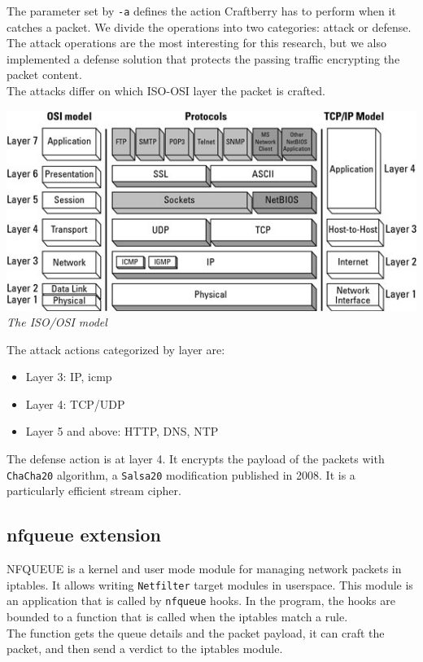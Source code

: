 \documentclass[12pt]{article}
\begin{document}
	The parameter set by \lstinline{-a} defines the action Craftberry has to perform when it catches a packet. We divide the operations into two categories: attack or defense. The attack operations are the most interesting for this research, but we also implemented a defense solution that protects the passing traffic encrypting the packet content.\\
	The attacks differ on which ISO-OSI layer the packet is crafted.\\
	
	\bigbreak

	\begin{center}
		\includegraphics[width=0.7\linewidth]{images/iso_osi_layers.jpg}\\
		\small{\textit{The ISO/OSI model}}
	\end{center}

	\bigbreak
	
	The attack actions categorized by layer are:
	\begin{itemize}
		\item Layer 3: IP, icmp
		\item Layer 4: TCP/UDP
		\item Layer 5 and above: HTTP, DNS, NTP
	\end{itemize}

	\bigbreak
	The defense action is at layer 4. It encrypts the payload of the packets with \lstinline{ChaCha20} algorithm, a \lstinline{Salsa20} modification published in 2008. It is a particularly efficient stream cipher.\\

	\subsection{nfqueue extension}
	NFQUEUE is a kernel and user mode module for managing network packets in iptables. It allows writing \lstinline{Netfilter} target modules in userspace. This module is an application that is called by \lstinline{nfqueue} hooks. In the program, the hooks are bounded to a function that is called when the iptables match a rule.\\
	The function gets the queue details and the packet payload, it can craft the packet, and then send a verdict to the iptables module. 
	
\end{document}
